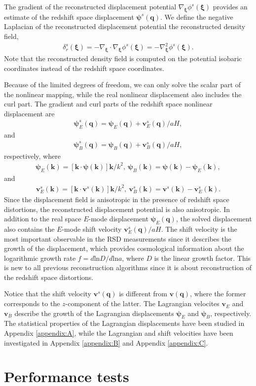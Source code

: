 \documentclass[aps,prd,twocolumn,superscriptaddress,groupedaddress,nofootinbib,amsfont]{revtex4}  %
\newcommand{\mr}{\mathrm}
\newcommand{\bea}{\begin{eqnarray}}
\newcommand{\eea}{\end{eqnarray}}
\newcommand{\bmp}{\bm{\psi}}
\newcommand{\bmv}{\bm{v}}
\newcommand{\bmk}{\bm{k}}
\newcommand{\bmq}{\bm{q}}
\newcommand{\bmxi}{\bm{\xi}}
\begin{document}
The gradient of the reconstructed  displacement potential $\nabla_{\bmxi}\phi^s(\bmxi)$ provides an estimate of the redshift space displacement $\bmp^s(\bmq)$.
We define the negative Laplacian of the reconstructed displacement potential 
the reconstructed density field,
\bea
\label{eq:density}
\delta_r^s(\bmxi)=-\nabla_{\bmxi}\cdot\nabla_{\bmxi}\phi^s(\bmxi)=-\nabla^2_{\bmxi}\phi^s(\bmxi).
\eea
Note that the reconstructed density field is computed on the potential isobaric
coordinates instead of the redshift space coordinates.

Because of the limited degrees of freedom, we can only solve the scalar part 
of the nonlinear mapping, while the real nonlinear displacement also includes 
the curl part. 
The gradient and curl parts of the redshift space nonlinear displacement are
\bea
\bmp^s_E(\bmq)=\bmp_E(\bmq)+{\bmv^s_E(\bmq)}/{aH},
\eea
and
\bea
\bmp^s_B(\bmq)=\bmp_B(\bmq)+{\bmv^s_B(\bmq)}/{aH},
\eea
respectively, where 
\bea
\bmp_E(\bmk)=[\bmk\cdot\bmp(\bmk)]\bmk/k^2,\ \bmp_B(\bmk)=\bmp(\bmk)-\bmp_E(\bmk),
\eea
and 
\bea
\bmv^s_E(\bmk)=[\bmk\cdot\bmv^s(\bmk)]\bmk/k^2,\ \bmv_B^s(\bmk)=\bmv^s(\bmk)-\bmv^s_E(\bmk).
\eea
Since the displacement field is anisotropic in the presence of redshift space
distortions, the reconstructed displacement potential is also anisotropic.
In addition to the real space $E$-mode displacement $\bmp_E(\bmq)$, the solved
displacement also contains the $E$-mode shift velocity $\bmv_E^s(\bmq)/aH$.
The shift velocity is the most important observable in the RSD measurements 
since it describes the growth of the displacement, which provides cosmological 
information about the logarithmic growth rate $f=d\mr{ln}D/d\mr{ln}a$, where
$D$ is the linear growth factor.
This is new to all previous reconstruction algorithms since it is about  
reconstruction of the redshift space distortions.

Notice that the shift velocity $\bmv^s(\bmq)$ is different from $\bmv(\bmq)$, 
where the former corresponds to the $z$-component of the latter.
The Lagrangian velocites $\bmv_{E}$ and $\bmv_{B}$ describe the growth of the 
Lagrangian displacements $\bmp_{E}$ and $\bmp_{B}$, respectively. 
The statistical properties of the Lagrangian displacements have been studied in
Appendix \ref{appendix:A}, while the Lagrangian and shift velocities have been
investigated in Appendix \ref{appendix:B} and Appendix \ref{appendix:C}.


\section{Performance tests}
\label{sec:prf}
\end{document}
